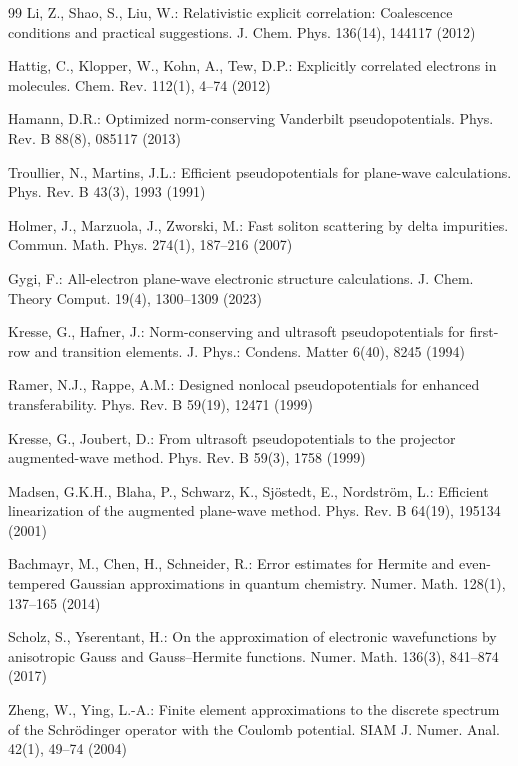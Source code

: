 \documentclass{sn-jnl}%
\numberwithin{equation}{section}
\theoremstyle{thmstyleone}%
\theoremstyle{thmstyletwo}%
\theoremstyle{thmstylethree}%
\begin{document}
\begin{thebibliography}{99}
Li, Z., Shao, S., Liu, W.: Relativistic explicit correlation: Coalescence conditions and practical suggestions.
J. Chem. Phys. 136(14), 144117 (2012)

Hattig, C., Klopper, W., Kohn, A., Tew, D.P.: Explicitly correlated electrons in molecules.
Chem. Rev. 112(1), 4--74 (2012)   %

Hamann, D.R.: Optimized norm-conserving Vanderbilt pseudopotentials.
Phys. Rev. B 88(8), 085117 (2013)

Troullier, N., Martins, J.L.: Efficient pseudopotentials for plane-wave calculations.
Phys. Rev. B 43(3), 1993 (1991)

Holmer, J., Marzuola, J., Zworski, M.: Fast soliton scattering by delta impurities.
Commun. Math. Phys. 274(1), 187--216 (2007)

Gygi, F.: All-electron plane-wave electronic structure calculations.
J. Chem. Theory Comput. 19(4), 1300--1309 (2023)

Kresse, G., Hafner, J.: Norm-conserving and ultrasoft pseudopotentials for first-row and transition elements.
J. Phys.: Condens. Matter 6(40), 8245 (1994)

Ramer, N.J., Rappe, A.M.: Designed nonlocal pseudopotentials for enhanced transferability.
Phys. Rev. B 59(19), 12471 (1999)

Kresse, G., Joubert, D.: From ultrasoft pseudopotentials to the projector augmented-wave method.
Phys. Rev. B 59(3), 1758 (1999)

Madsen, G.K.H., Blaha, P., Schwarz, K., Sjöstedt, E., Nordström, L.: Efficient linearization of the augmented plane-wave method.
Phys. Rev. B 64(19), 195134 (2001)

Bachmayr, M., Chen, H., Schneider, R.: Error estimates for Hermite and even-tempered Gaussian approximations in quantum chemistry.
Numer. Math. 128(1), 137--165 (2014)

Scholz, S., Yserentant, H.: On the approximation of electronic wavefunctions by anisotropic Gauss and Gauss--Hermite functions.
Numer. Math. 136(3), 841--874 (2017)

Zheng, W., Ying, L.-A.: Finite element approximations to the discrete spectrum of the Schrödinger operator with the Coulomb potential.
SIAM J. Numer. Anal. 42(1), 49--74 (2004)


\end{thebibliography}
\end{document}
